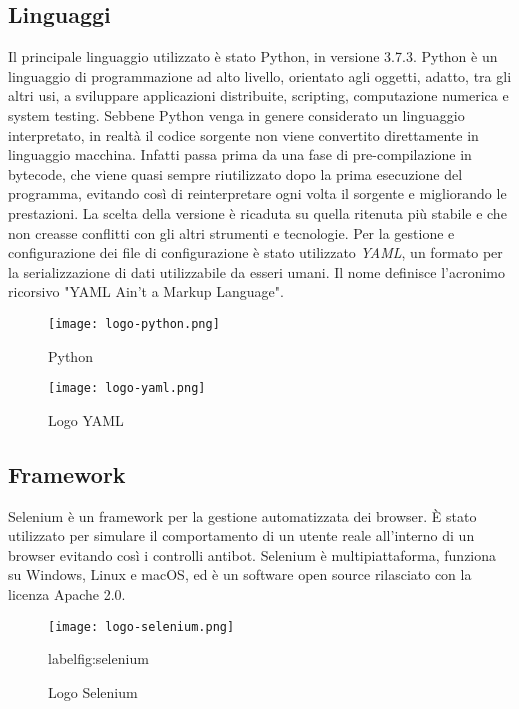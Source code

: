 \subsection{Linguaggi}
Il principale linguaggio utilizzato è stato Python, in versione 3.7.3. Python è un linguaggio di programmazione ad alto livello, orientato agli oggetti, adatto, tra gli altri usi, a sviluppare applicazioni distribuite, scripting, computazione numerica e system testing. Sebbene Python venga in genere considerato un linguaggio interpretato, in realtà il codice sorgente non viene convertito direttamente in linguaggio macchina. Infatti passa prima da una fase di pre-compilazione in bytecode, che viene quasi sempre riutilizzato dopo la prima esecuzione del programma, evitando così di reinterpretare ogni volta il sorgente e migliorando le prestazioni. La scelta della versione è ricaduta su quella ritenuta più stabile e che non creasse conflitti con gli altri strumenti e tecnologie.\newline{}
Per la gestione e configurazione dei file di configurazione è stato utilizzato \textit{YAML}, un formato per la serializzazione di dati utilizzabile da esseri umani. Il nome definisce l'acronimo ricorsivo "YAML Ain't a Markup Language".
\begin{figure}[!h]
    \begin{minipage}{.5\textwidth} 
        \centering 
        \texttt{[image: logo-python.png]} 
        \caption{Python} 
        \label{fig:python} 
    \end{minipage}%
    \begin{minipage}{.5\textwidth} 
        \centering 
        \texttt{[image: logo-yaml.png]} 
        \caption{Logo YAML} 
        \label{fig:yaml} 
    \end{minipage}%
\end{figure}
\subsection{Framework}
Selenium è un framework per la gestione automatizzata dei browser. È stato utilizzato per simulare il comportamento di un utente reale all'interno di un browser evitando così i controlli antibot. Selenium è multipiattaforma, funziona su Windows, Linux e macOS, ed è un software open source rilasciato con la licenza Apache 2.0.
\begin{figure}[!h] 
    \centering 
    \texttt{[image: logo-selenium.png]} 
    \caption{Logo Selenium}
    label{fig:selenium} 
\end{figure}

